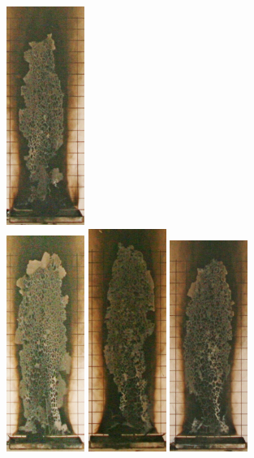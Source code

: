 \documentclass[twoside]{uocthesis}
\begin{document}
\begin{figure}[p]
	\includegraphics[width=1.0in]{../Figures/GBGAS_17_IMG_5875}	\\

	\includegraphics[width=1.0in]{../Figures/GBGAS_18_IMG_5895}
	\includegraphics[width=1.0in]{../Figures/GBGAS_19_IMG_5967}
	\includegraphics[width=1.0in]{../Figures/GBGAS_20_IMG_5986}

\end{figure}
\end{document}
